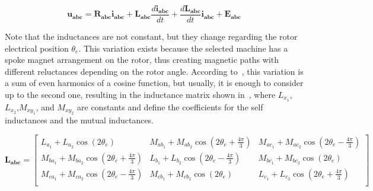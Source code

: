 \begin{equation}
	\mathbf{u_{abc}}
	=
	\mathbf{R_{abc}}
	\mathbf{i_{abc}}
	+
	\mathbf{L_{abc}}
	\frac{d\mathbf{i_{abc}}}{dt}
	+
	\frac{d\mathbf{L_{abc}}}{dt}  \mathbf{i_{abc}}
	+\mathbf{E_{abc}}
	\label{eq:voltage_balance}%
\end{equation}


Note that the inductances are not constant, but they change regarding the rotor electrical position $\theta_e$. This variation exists because the selected machine has a spoke magnet arrangement on the rotor, thus creating magnetic paths with different reluctances depending on the rotor angle. According to~\citet{Marques:Dinamica_das_maquinas_eletricas:2002}, this variation is a sum of even harmonics of a cosine function, but usually, it is enough to consider up to the second one, resulting in the inductance matrix shown in~, where $L_{x_1}$,$L_{x_2}$,$M_{xy_1}$, and $M_{xy_2}$ are constants and define the coefficients for the self inductances and the mutual inductances.

\begin{equation}
	\mathbf{L_{abc}} =
	\begin{bmatrix}
		L_{a_1} + L_{a_2} \cos{ \left(2 \theta_e\right)}                    & M_{ab_1} + M_{ab_2} \cos{ \left(2 \theta_e + \frac{4\pi}{3}\right)} & M_{ac_1} + M_{ac_2} \cos{ \left(2 \theta_e - \frac{4\pi}{3}\right)} \\
		M_{ba_1} + M_{ba_2} \cos{ \left(2 \theta_e + \frac{4\pi}{3}\right)} & L_{b_1} + L_{b_2} \cos{ \left(2 \theta_e - \frac{4\pi}{3}\right)}   & M_{bc_1} + M_{bc_2} \cos{ \left(2 \theta_e\right)}                  \\
		M_{ca_1} + M_{ca_2} \cos{ \left(2 \theta_e - \frac{4\pi}{3}\right)} & M_{cb_1} + M_{cb_2} \cos{ \left(2 \theta_e\right)}                  & L_{c_1} + L_{c_2} \cos{ \left(2 \theta_e + \frac{4\pi}{3}\right)}   \\
	\end{bmatrix}
	\label{eq:phase_inductances}
\end{equation}

